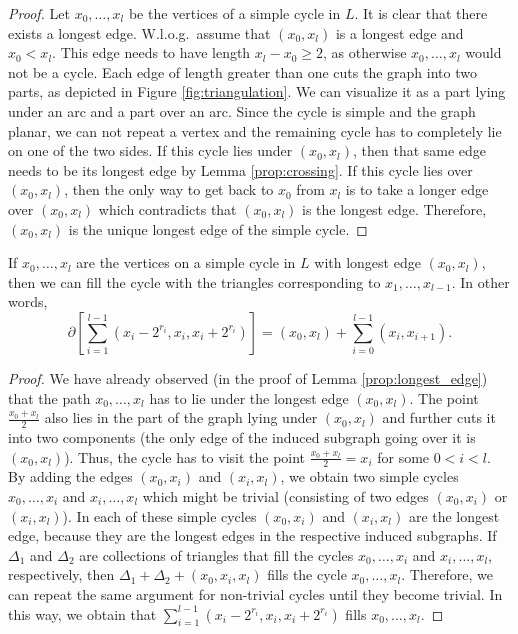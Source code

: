 \documentclass[a4paper,UKenglish,cleveref,nolineno,autoref]{socg-lipics-v2021}
\begin{document}
\begin{proof}
Let $x_0,\ldots,x_l$ be the vertices of a simple cycle in $L$. It is clear that there exists a longest edge. W.l.o.g.\ assume that $(x_0,x_l)$ is a longest edge and $x_0<x_l$. This edge needs to have length $x_l-x_0\geq 2$, as otherwise $x_0,\ldots,x_l$ would not be a cycle. Each edge of length greater than one cuts the graph into two parts, as depicted in Figure \ref{fig:triangulation}. We can visualize it as a part lying under an arc and a part over an arc.  Since the cycle is simple and the graph planar, we can not repeat a vertex and the remaining cycle has to completely lie on one of the two sides. If this cycle lies under $(x_0,x_l)$, then that same edge needs to be its longest edge by Lemma \ref{prop:crossing}. If this cycle lies over $(x_0,x_l)$, then  the only way to get back to $x_0$ from $x_l$ is to take a longer edge over $(x_0,x_l)$ which contradicts that $(x_0,x_l)$ is the longest edge. Therefore, $(x_0,x_l)$ is the unique longest edge of the simple cycle.    
\end{proof}


\begin{lemma} \label{prop:filling_simple_cycles}
If $x_0,\ldots,x_l$ are the vertices on a simple cycle in $L$ with longest edge $(x_0,x_l)$, then we can fill the cycle with the triangles corresponding to $x_1,\ldots,x_{l-1}$. In other words,
\begin{equation*}
\partial\left[\sum _{i=1}^{l-1}(x_i-2^{r_i},x_i,x_i+2^{r_i})\right]=(x_0,x_l)+\sum_{i=0}^{l-1} (x_i,x_{i+1}).
\end{equation*}
\end{lemma}

\begin{proof}
We have already observed (in the proof of Lemma \ref{prop:longest_edge}) that the path $x_0,\ldots,x_l$ has to lie under the longest edge $(x_0,x_l)$. The point $\frac{x_0+x_l}{2}$ also lies in the part of the graph lying under $(x_0,x_l)$ and further cuts it into two components (the only edge of the induced subgraph going over it is $(x_0,x_l)$). Thus, the cycle has to visit the point $\frac{x_0+x_l}{2}=x_i$ for some $0<i<l$. By adding the edges $(x_0,x_i)$ and $(x_i,x_l)$, we obtain two simple cycles $x_0,\ldots,x_i$ and $x_i,\ldots,x_l$ which might be trivial (consisting of two edges $(x_0,x_i)$ or $(x_i,x_l)$). In each of these simple cycles $(x_0,x_i)$ and $(x_i,x_l)$ are the longest edge, because they are the longest edges in the respective induced subgraphs. If $\Delta_1$ and $\Delta_2$ are collections of triangles that fill the cycles $x_0,\ldots,x_i$ and $x_i,\ldots,x_l$, respectively, then $\Delta_1+\Delta_2+(x_0,x_i,x_l)$ fills the cycle $x_0,\ldots,x_l$. Therefore, we can repeat the same argument for non-trivial cycles until they become trivial. In this way, we obtain that $\sum _{i=1}^{l-1}(x_i-2^{r_i},x_i,x_i+2^{r_i})$ fills $x_0,\ldots,x_l$.
\end{proof}
\end{document}

